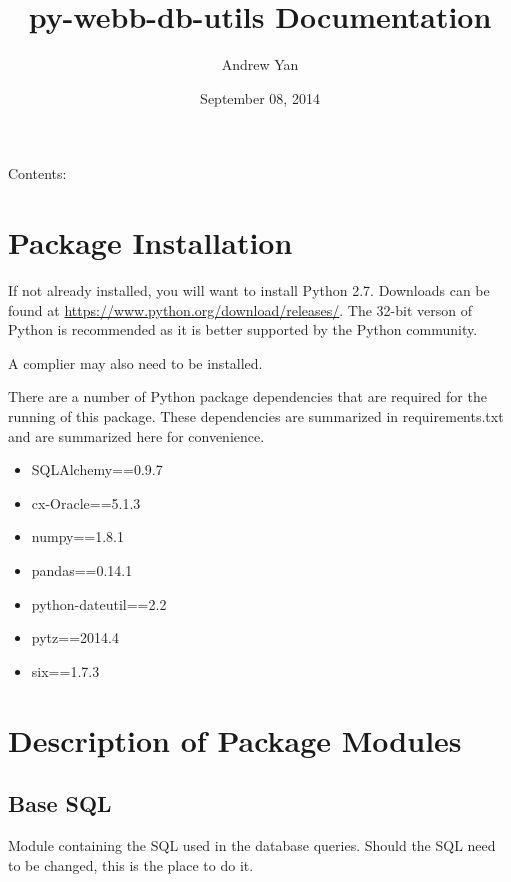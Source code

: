 \documentclass[letterpaper,10pt,english]{sphinxmanual}
\title{py-webb-db-utils Documentation}
\date{September 08, 2014}
\author{Andrew Yan}
\begin{document}
\maketitle
\tableofcontents
{}\label{webb_utils_doc::doc}


Contents:


\chapter{Package Installation}
\label{installation::doc}\label{installation:welcome-to-py-webb-db-utils-s-documentation}\label{installation:package-installation}
If not already installed, you will want to install Python 2.7. Downloads can be found
at \href{https://www.python.org/download/releases/}{https://www.python.org/download/releases/}. The 32-bit verson of Python is recommended
as it is better supported by the Python community.

A complier may also need to be installed.

There are a number of Python package dependencies that are required for the running
of this package. These dependencies are summarized in requirements.txt and are summarized
here for convenience.
\begin{itemize}
\item {} 
SQLAlchemy==0.9.7

\item {} 
cx-Oracle==5.1.3

\item {} 
numpy==1.8.1

\item {} 
pandas==0.14.1

\item {} 
python-dateutil==2.2

\item {} 
pytz==2014.4

\item {} 
six==1.7.3

\end{itemize}


\chapter{Description of Package Modules}
\label{modules::doc}\label{modules:description-of-package-modules}

\section{Base SQL}
\label{modules:base-sql}
Module containing the SQL used in the database queries.
Should the SQL need to be changed, this is the place to
do it.
\end{document}
